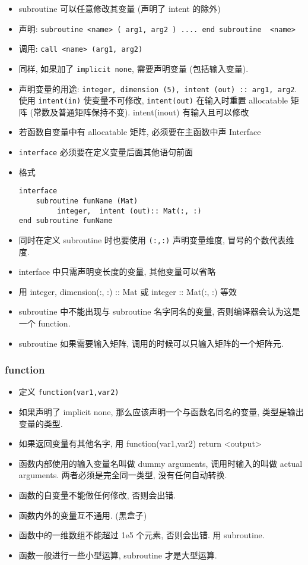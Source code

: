 \begin{itemize}
\item subroutine 可以任意修改其变量 (声明了 intent 的除外)
\item 声明: \verb`subroutine <name> ( arg1, arg2 ) .... end subroutine  <name>`
\item 调用:  \verb`call <name> (arg1, arg2)`
\item 同样, 如果加了 \verb`implicit none`,  需要声明变量 (包括输入变量).
\item 声明变量的用途: \verb`integer, dimension (5), intent (out) :: arg1, arg2`. 使用 \verb`intent(in)` 使变量不可修改, \verb`intent(out)` 在输入时重置 allocatable 矩阵 (常数及普通矩阵保持不变). intent(inout) 有输入且可以修改
\item 若函数自变量中有 allocatable 矩阵, 必须要在主函数中声 Interface
\item \verb`interface` 必须要在定义变量后面其他语句前面
\item 格式
\begin{lstlisting}
interface
    subroutine funName (Mat)
         integer,  intent (out):: Mat(:, :)
end subroutine funName
\end{lstlisting}
\item 同时在定义 subroutine 时也要使用 \verb`(:,:)` 声明变量维度, 冒号的个数代表维度.
\item interface 中只需声明变长度的变量, 其他变量可以省略
\item 用 integer, dimension(:, :) :: Mat 或 integer :: Mat(:, :) 等效
\item subroutine 中不能出现与 subroutine 名字同名的变量, 否则编译器会认为这是一个 function.
\item subroutine 如果需要输入矩阵, 调用的时候可以只输入矩阵的一个矩阵元.
\end{itemize}

\subsubsection{function}
\begin{itemize}
\item 定义 \verb`function(var1,var2)`
\item 如果声明了 implicit none, 那么应该声明一个与函数名同名的变量, 类型是输出变量的类型.
\item 如果返回变量有其他名字, 用 function(var1,var2) return <output>
\item 函数内部使用的输入变量名叫做 dummy arguments, 调用时输入的叫做 actual arguments. 两者必须是完全同一类型, 没有任何自动转换.
\item 函数的自变量不能做任何修改, 否则会出错.
\item 函数内外的变量互不通用. (黑盒子)
\item 函数中的一维数组不能超过 1e5 个元素, 否则会出错. 用 subroutine.
\item 函数一般进行一些小型运算, subroutine 才是大型运算.
\end{itemize}

